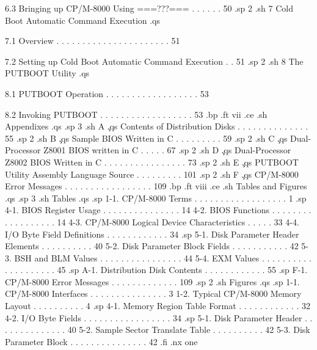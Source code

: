    6.3  Bringing up CP/M-8000 Using ===???=== . . . . . .  50 
.sp 2
.sh
7  Cold Boot Automatic Command Execution  
.qs

   7.1  Overview  . . . . . . . . . . . . . . . . . . . . . .  51 

   7.2  Setting up Cold Boot Automatic Command Execution  . .  51
.sp 2
.sh
8  The PUTBOOT Utility  
.qs

   8.1  PUTBOOT Operation . . . . . . . . . . . . . . . . . .  53 

   8.2  Invoking PUTBOOT  . . . . . . . . . . . . . . . . . .  53 
.bp
.ft                                 vii
.ce
.sh
Appendixes
.qs
.sp 3
.sh
A  \c
.qs
Contents of Distribution Disks . . . . . . . . . . . . . .  55 
.sp 2
.sh
B  \c
.qs
Sample BIOS Written in C . . . . . . . . .  59
.sp 2
.sh
C  \c
.qs
Dual-Processor Z8001 BIOS written in C  . . . . .  67
.sp 2
.sh
D  \c
.qs
Dual-Processor Z8002 BIOS Written in C . . . . . . . . . . . . . . . .  73
.sp 2
.sh
E  \c
.qs
PUTBOOT Utility Assembly Language Source . . . . . . . . . 101
.sp 2
.sh
F  \c
.qs
CP/M-8000 Error Messages  . . . . . . . . . . . . . . . . . 109 
.bp
.ft                                viii
.ce
.sh
Tables and Figures
.qs
.sp 3
.sh
Tables
.qs
.sp
     1-1.  CP/M-8000 Terms . . . . . . . . . . . . . . . . . .   1
.sp
     4-1.  BIOS Register Usage  . . . . . . . . . . . . . . .  14
     4-2.  BIOS Functions . . . . . . . . . . . . . . . . . .  14
     4-3.  CP/M-8000 Logical Device Characteristics  . . . . .  33
     4-4.  I/O Byte Field Definitions . . . . . . . . . . . .  34
.sp
     5-1.  Disk Parameter Header Elements . . . . . . . . . .  40
     5-2.  Disk Parameter Block Fields  . . . . . . . . . . .  42
     5-3.  BSH and BLM Values . . . . . . . . . . . . . . . .  44
     5-4.  EXM Values . . . . . . . . . . . . . . . . . . . .  45
.sp
     A-1.  Distribution Disk Contents . . . . . . . . . . . .  55
.sp
     F-1.  CP/M-8000 Error Messages  . . . . . . . . . . . . . 109
.sp 2
.sh
Figures
.qs
.sp
     1-1.  CP/M-8000 Interfaces  . . . . . . . . . . . . . . .   3
     1-2.  Typical CP/M-8000 Memory Layout . . . . . . . . . .   4
.sp
     4-1.  Memory Region Table Format . . . . . . . . . . . .  32
     4-2.  I/O Byte Fields  . . . . . . . . . . . . . . . . .  34
.sp  
     5-1.  Disk Parameter Header  . . . . . . . . . . . . . .  40
     5-2.  Sample Sector Translate Table  . . . . . . . . . .  42
     5-3.  Disk Parameter Block . . . . . . . . . . . . . . .  42
.fi
.nx one


